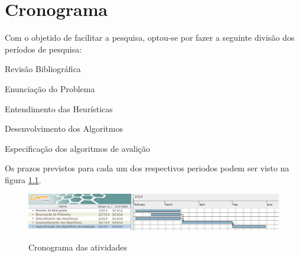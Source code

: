 \chapter{Cronograma}\label{cap:cronograma}

Com o objetido de facilitar a pesquisa, optou-se por
fazer a seguinte divisão dos períodos de pesquisa:
\begin{description}
  \item Revisão Bibliográfica
  \item Enunciação do Problema
  \item Entendimento das Heurísticas
  \item Desenvolvimento dos Algoritmos
  \item Especificação dos algoritmos de avalição
\end{description}
Os prazos previstos para cada um dos respectivos periodos
podem ser visto na figura \ref{cron}.

\begin{figure}[h!]
  \includegraphics[width = \linewidth]{imgs/cronograma}
  \label{cron}
  \caption{Cronograma das atividades}
  
\end{figure}
